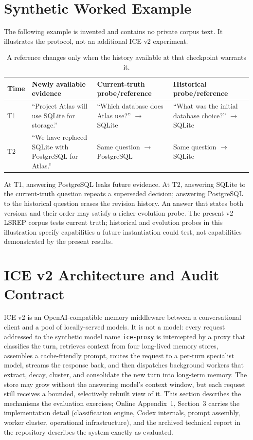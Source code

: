 \documentclass[twoside,11pt]{article}
\begin{document}
\section{Synthetic Worked Example}
\label{sec:worked-example}
The following example is invented and contains no private corpus text. It illustrates the protocol, not an additional ICE v2 experiment.
\begin{table}[tbp]
\centering\small


\begin{tabular}{@{}L{1.0cm}L{4.0cm}L{3.6cm}L{3.6cm}@{}}\toprule
Time & Newly available evidence & Current-truth probe/reference & Historical probe/reference\\\midrule
T1 & ``Project Atlas will use SQLite for storage.'' & ``Which database does Atlas use?'' $\to$ SQLite & ``What was the initial database choice?'' $\to$ SQLite\\
T2 & ``We have replaced SQLite with PostgreSQL for Atlas.'' & Same question $\to$ PostgreSQL & Same question $\to$ SQLite\\\bottomrule
\end{tabular}
\caption{A reference changes only when the history available at that checkpoint warrants it.}
\label{tab:worked-example}
\end{table}
At T1, answering PostgreSQL leaks future evidence. At T2, answering SQLite to the current-truth question repeats a superseded decision; answering PostgreSQL to the historical question erases the revision history. An answer that states both versions and their order may satisfy a richer evolution probe. The present v2 LSREP corpus tests current truth; historical and evolution probes in this illustration specify capabilities a future instantiation could test, not capabilities demonstrated by the present results.

\section{ICE v2 Architecture and Audit Contract}
\label{sec:architecture}

ICE v2 is an OpenAI-compatible memory middleware between a conversational client and a pool of locally-served models. It is not a model: every request addressed to the synthetic model name \texttt{ice-proxy} is intercepted by a proxy that classifies the turn, retrieves context from four long-lived memory stores, assembles a cache-friendly prompt, routes the request to a per-turn specialist model, streams the response back, and then dispatches background workers that extract, decay, cluster, and consolidate the new turn into long-term memory. The store may grow without the answering model's context window, but each request still receives a bounded, selectively rebuilt view of it. This section describes the mechanisms the evaluation exercises; Online Appendix~1, Section~3 carries the implementation detail (classification engine, Codex internals, prompt assembly, worker cluster, operational infrastructure), and the archived technical report in the repository describes the system exactly as evaluated.
\end{document}
